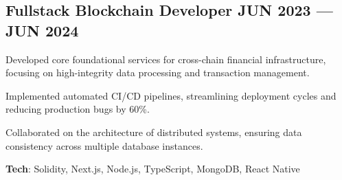 \documentclass[letter,10pt]{article}
\begin{document}
\subsection{{ Fullstack Blockchain Developer \hfill JUN 2023 --- JUN 2024}}
\begin{zitemize}
  \item Developed core foundational services for cross-chain financial infrastructure, focusing on high-integrity data processing and transaction management.
  \item Implemented automated CI/CD pipelines, streamlining deployment cycles and reducing production bugs by 60\%.
  \item Collaborated on the architecture of distributed systems, ensuring data consistency across multiple database instances.
  \item \textbf{Tech}: Solidity, Next.js, Node.js, TypeScript, MongoDB, React Native
\end{zitemize}
\end{document}
